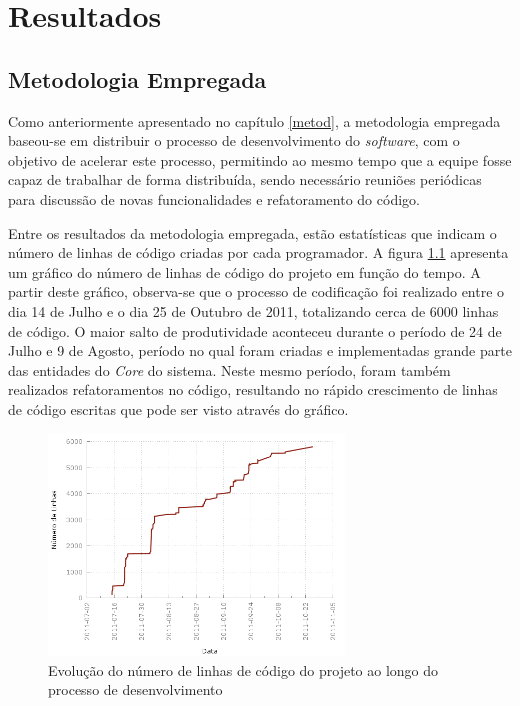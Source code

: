 \chapter{Resultados}
\label{chap:result}

\section{Metodologia Empregada}

Como anteriormente apresentado no capítulo \ref{metod}, a metodologia empregada baseou-se em distribuir o processo de desenvolvimento do \emph{software}, com o objetivo de acelerar este processo, permitindo ao mesmo tempo que a equipe fosse capaz de trabalhar de forma distribuída, sendo necessário reuniões periódicas para discussão de novas funcionalidades e refatoramento do código.

Entre os resultados da metodologia empregada, estão estatísticas que indicam o número de linhas de código criadas por cada programador.
A figura \ref{fig:linesofcode} apresenta um gráfico do número de linhas de código do projeto em função do tempo.
A partir deste gráfico, observa-se que o processo de codificação foi realizado entre o dia 14 de Julho e o dia 25 de Outubro de 2011, totalizando cerca de 6000 linhas de código.
O maior salto de produtividade aconteceu durante o período de 24 de Julho e 9 de Agosto, período no qual foram criadas e implementadas grande parte das entidades do \emph{Core} do sistema.
Neste mesmo período, foram também realizados refatoramentos no código, resultando no rápido crescimento de linhas de código escritas que pode ser visto através do gráfico.

\begin{figure}[!htb]
	\centering
	\includegraphics[width=0.7\textwidth]{./plots/lines_of_code.png}
	\caption[Evolução do número de linhas de código do projeto]{Evolução do número de linhas de código do projeto ao longo do processo de desenvolvimento}
	\label{fig:linesofcode}
\end{figure}


